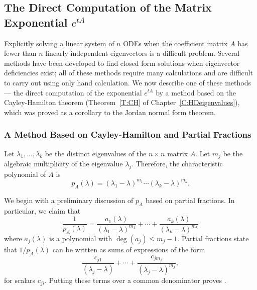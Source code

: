 \subsection*{The Direct Computation of the Matrix Exponential $e^{tA}$}

Explicitly solving a linear system of $n$ ODEs when the coefficient 
matrix $A$ has fewer than $n$ linearly independent eigenvectors is 
a difficult problem.  Several methods have been developed to find 
closed form solutions when eigenvector deficiencies exist; all of these 
methods require many calculations and are difficult to carry out using 
only hand calculation.  We now describe one of these methods --- the 
direct computation of the exponential $e^{tA}$ by a method based on the 
Cayley-Hamilton theorem 
(Theorem~\ref{T:CH} of 
Chapter~\ref{C:HDeigenvalues}), which was proved as a corollary to the 
Jordan normal form theorem.

\subsubsection*{A Method Based on Cayley-Hamilton and Partial Fractions}

Let $\lambda_1,\ldots,\lambda_k$ be the distinct eigenvalues of the 
$n\times n$ matrix $A$.  Let $m_j$ be the algebraic multiplicity of the 
eigenvalue $\lambda_j$.  Therefore, the characteristic polynomial
 of $A$ is 
\[
p_A(\lambda) = (\lambda_1-\lambda)^{m_1}\cdots(\lambda_k-\lambda)^{m_k}.
\]

We begin with a preliminary discussion of $p_A$ based on partial fractions.
In particular, we claim that 
\begin{equation}  \label{e:1/p}
\frac{1}{p_A(\lambda)} = \frac{a_1(\lambda)}{(\lambda_1-\lambda)^{m_1}} +\cdots
	+ \frac{a_k(\lambda)}{(\lambda_k-\lambda)^{m_k}}
\end{equation}
where $a_j(\lambda)$ is a polynomial with $\deg(a_j)\leq m_j-1$.  Partial 
fractions state that $1/p_A(\lambda)$ can be written as sums of expressions 
of the form
\[
\frac{c_{j1}}{(\lambda_j-\lambda)} + \cdots + \frac{c_{jm_j}}{(\lambda_j-\lambda)^{m_j}},
\]
for scalars $c_{ji}$.  Putting these terms over a common denominator proves 
.

